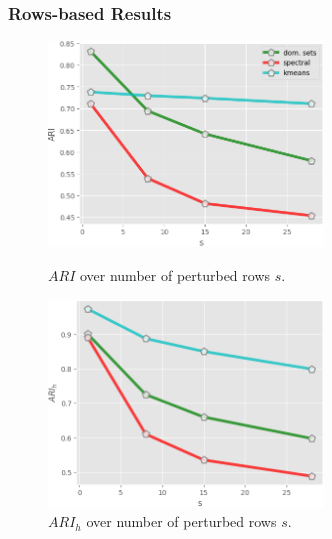 \documentclass{beamer}
\begin{document}
\begin{frame}
	\frametitle{Rows-based Results}
	\begin{figure}[H]
		\begin{minipage}[t]{0.48\linewidth}
			\centering
			\includegraphics[width=0.65\textwidth]{img/advrows/rows_ARI.png}
			\caption{\footnotesize $ARI$ over number of perturbed rows $s$.}
		\end{minipage}        
		\hspace{.1cm}
		\begin{minipage}[t]{0.48\linewidth}
			\centering
			\includegraphics[width=0.65\textwidth]{img/advrows/rows_ARIh.png}
			\caption{\footnotesize $ARI_h$ over number of perturbed rows $s$.}
		\end{minipage}
	\end{figure}


\end{frame}
\end{document}
